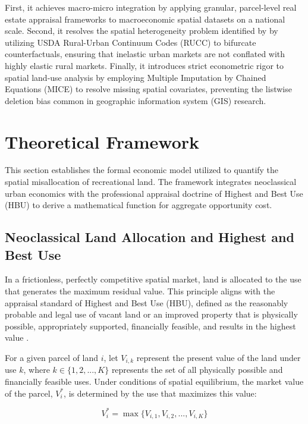 \documentclass[10pt, letterpaper]{article}
\begin{document}
First, it achieves macro-micro integration by applying granular, parcel-level real estate appraisal frameworks \parencite{AppraisalInstitute2020} to macroeconomic spatial datasets on a national scale. Second, it resolves the spatial heterogeneity problem identified by \textcite{Davis2008} by utilizing USDA Rural-Urban Continuum Codes (RUCC) to bifurcate counterfactuals, ensuring that inelastic urban markets are not conflated with highly elastic rural markets. Finally, it introduces strict econometric rigor to spatial land-use analysis by employing Multiple Imputation by Chained Equations (MICE) \parencite{Buuren2018} to resolve missing spatial covariates, preventing the listwise deletion bias common in geographic information system (GIS) research.


\newpage

\section{Theoretical Framework}

This section establishes the formal economic model utilized to quantify the spatial misallocation of recreational land. The framework integrates neoclassical urban economics with the professional appraisal doctrine of Highest and Best Use (HBU) to derive a mathematical function for aggregate opportunity cost.

\subsection{Neoclassical Land Allocation and Highest and Best Use}
In a frictionless, perfectly competitive spatial market, land is allocated to the use that generates the maximum residual value. This principle aligns with the appraisal standard of Highest and Best Use (HBU), defined as the reasonably probable and legal use of vacant land or an improved property that is physically possible, appropriately supported, financially feasible, and results in the highest value \parencite{AppraisalInstitute2020}. 

For a given parcel of land $i$, let $V_{i,k}$ represent the present value of the land under use $k$, where $k \in \{1, 2, ..., K\}$ represents the set of all physically possible and financially feasible uses. Under conditions of spatial equilibrium, the market value of the parcel, $V_i^*$, is determined by the use that maximizes this value:

\begin{equation}
    V_i^* = \max \{V_{i,1}, V_{i,2}, ..., V_{i,K}\}
\end{equation}
\end{document}
